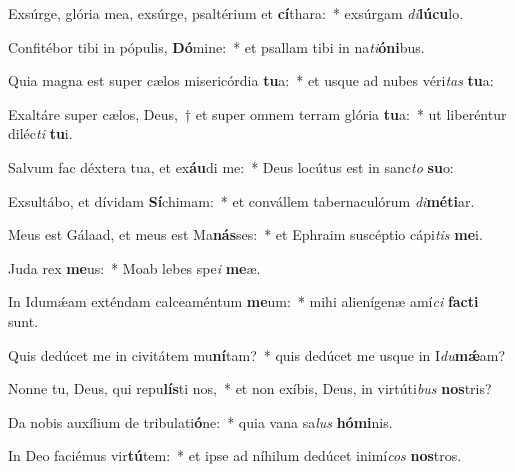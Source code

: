 \item Exsúrge, glória mea, exsúrge, psaltérium et \textbf{cí}thara:~* exsúrgam \textit{di}\textbf{lú}\textbf{cu}lo.
\item Confitébor tibi in pópulis, \textbf{Dó}mine:~* et psallam tibi in na\textit{ti}\textbf{ó}\textbf{ni}bus.
\item Quia magna est super cælos misericórdia \textbf{tu}a:~* et usque ad nubes véri\textit{tas} \textbf{tu}a:
\item Exaltáre super cælos, Deus,~† et super omnem terram glória \textbf{tu}a:~* ut liberéntur diléc\textit{ti} \textbf{tu}i.
\item Salvum fac déxtera tua, et ex\textbf{áu}di me:~* Deus locútus est in sanc\textit{to} \textbf{su}o:
\item Exsultábo, et dívidam \textbf{Sí}chimam:~* et convállem tabernaculórum \textit{di}\textbf{mé}\textbf{ti}ar.
\item Meus est Gálaad, et meus est Ma\textbf{nás}ses:~* et Ephraim suscéptio cápi\textit{tis} \textbf{me}i.
\item Juda rex \textbf{me}us:~* Moab lebes spe\textit{i} \textbf{me}æ.
\item In Idumǽam exténdam calceaméntum \textbf{me}um:~* mihi alienígenæ amí\textit{ci} \textbf{fac}\textbf{ti} sunt.
\item Quis dedúcet me in civitátem mu\textbf{ní}tam?~* quis dedúcet me usque in I\textit{du}\textbf{mǽ}am?
\item Nonne tu, Deus, qui repu\textbf{lís}ti nos,~* et non exíbis, Deus, in virtúti\textit{bus} \textbf{nos}tris?
\item Da nobis auxílium de tribulati\textbf{ó}ne:~* quia vana sa\textit{lus} \textbf{hó}\textbf{mi}nis.
\item In Deo faciémus vir\textbf{tú}tem:~* et ipse ad níhilum dedúcet inimí\textit{cos} \textbf{nos}tros.
